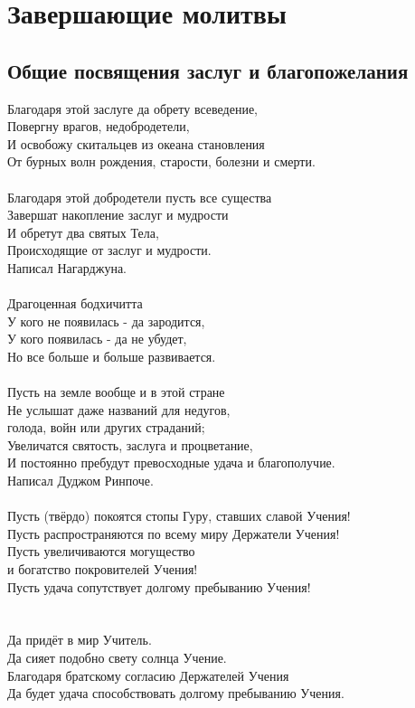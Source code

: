 
\section{Завершающие молитвы}

\subsection{Общие посвящения заслуг и благопожелания}

Благодаря этой заслуге да обрету всеведение,\\
Повергну врагов, недобродетели,\\
И освобожу скитальцев из океана становления \\
От бурных волн рождения, старости, болезни и смерти.\\
\\
Благодаря этой добродетели пусть все существа\\
Завершат накопление заслуг и мудрости \\
И обретут два святых Тела,\\
Происходящие от заслуг и мудрости.\\
Написал Нагарджуна.\\
\\
Драгоценная бодхичитта\\
У кого не появилась - да зародится,\\
У кого появилась - да не убудет,\\
Но все больше и больше развивается.\\
\\
Пусть на земле вообще и в этой стране\\
Не услышат даже названий для недугов, \\ \indent голода, войн или других страданий;\\
Увеличатся святость, заслуга и процветание,\\
И постоянно пребудут превосходные удача и благополучие.\\
Написал Дуджом Ринпоче.\\
\\
Пусть (твёрдо) покоятся стопы Гуру, ставших славой Учения!\\
Пусть распространяются по всему миру Держатели Учения!\\
Пусть увеличиваются могущество \\ \indent и богатство покровителей Учения!\\
Пусть удача сопутствует долгому пребыванию Учения!\\
\\
\newpage
\\
Да придёт в мир Учитель.\\
Да сияет подобно свету солнца Учение.\\
Благодаря братскому согласию Держателей Учения\\
Да будет удача способствовать долгому пребыванию Учения.

